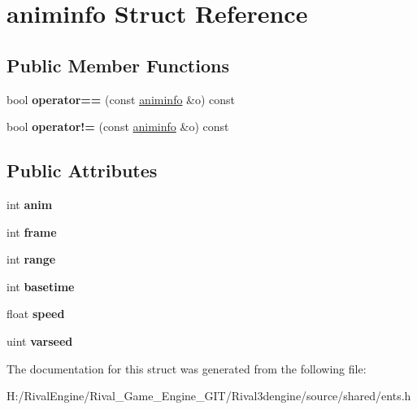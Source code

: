 \hypertarget{structaniminfo}{}\section{animinfo Struct Reference}
\label{structaniminfo}
\subsection*{Public Member Functions}
\begin{DoxyCompactItemize}
\item 
\mbox{\label{structaniminfo_ad793c029705a3b7439ba5435b092ec94}} 
bool {\bfseries operator==} (const \hyperlink{structaniminfo}{animinfo} \&o) const
\item 
\mbox{\label{structaniminfo_ab5e8ce58ba8c1d755a1c60d9348cdf6d}} 
bool {\bfseries operator!=} (const \hyperlink{structaniminfo}{animinfo} \&o) const
\end{DoxyCompactItemize}
\subsection*{Public Attributes}
\begin{DoxyCompactItemize}
\item 
\mbox{\label{structaniminfo_ab65d6d0e100929ab8e94fb1b4a150911}} 
int {\bfseries anim}
\item 
\mbox{\label{structaniminfo_a2c6f216b77b1d5e484d7acb8b8d04e6c}} 
int {\bfseries frame}
\item 
\mbox{\label{structaniminfo_a4fb017dd4e6c951720cd4969eec13528}} 
int {\bfseries range}
\item 
\mbox{\label{structaniminfo_a43bc563d24818f5bad8ae0a96c89b654}} 
int {\bfseries basetime}
\item 
\mbox{\label{structaniminfo_a064d4012692db2123ebcdd40d2a726cb}} 
float {\bfseries speed}
\item 
\mbox{\label{structaniminfo_abc6bba14e97b6adcace6d95a6dbdd23a}} 
uint {\bfseries varseed}
\end{DoxyCompactItemize}


The documentation for this struct was generated from the following file\+:\begin{DoxyCompactItemize}
\item 
H\+:/\+Rival\+Engine/\+Rival\+\_\+\+Game\+\_\+\+Engine\+\_\+\+G\+I\+T/\+Rival3dengine/source/shared/ents.\+h\end{DoxyCompactItemize}
